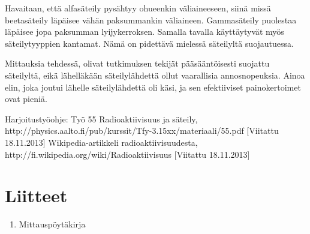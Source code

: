 \documentclass[a4paper,11pt]{article}
\begin{document}
Havaitaan, että alfasäteily pysähtyy ohueenkin väliaineeseen, siinä missä beetasäteily läpäisee vähän paksummankin väliaineen. Gammasäteily puolestaa läpäisee jopa paksumman lyijykerroksen. Samalla tavalla käyttäytyvät myös säteilytyyppien kantamat. Nämä on pidettävä mielessä säteilyltä suojautuessa. 

Mittauksia tehdessä, olivat tutkimuksen tekijät pääsääntöisesti suojattu säteilyltä, eikä lähelläkään säteilylähdettä ollut vaarallisia annosnopeuksia. Ainoa elin, joka joutui lähelle säteilylähdettä oli käsi, ja sen efektiiviset painokertoimet ovat pieniä. 


\begin{thebibliography}{99}

 Harjoitustyöohje: Työ 55 Radioaktiivisuus ja säteily, http://physics.aalto.fi/pub/kurssit/Tfy-3.15xx/materiaali/55.pdf [Viitattu 18.11.2013]
 Wikipedia-artikkeli radioaktiivisuudesta, http://fi.wikipedia.org/wiki/Radioaktiivisuus [Viitattu 18.11.2013]

\end{thebibliography}

\section*{Liitteet}
\begin{enumerate}
\item{Mittauspöytäkirja}\label{mittaus}

\end{enumerate}
\end{document}
